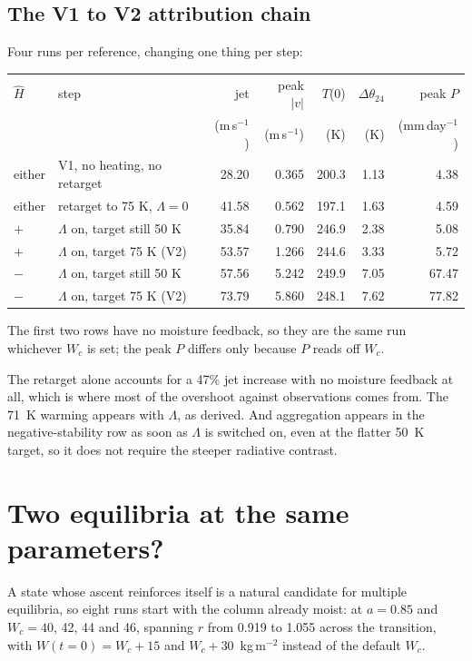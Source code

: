 \documentclass[11pt]{article}
\newcommand{\Hhat}{\hat{H}}
\newcommand{\mmday}{mm\,day$^{-1}$}
\newcommand{\ms}{m\,s$^{-1}$}
\begin{document}
\subsection{The V1 to V2 attribution chain}

Four runs per reference, changing one thing per step:

\begin{center}
\footnotesize
\begin{tabular}{llrrrrr}
\toprule
$\Hhat$ & step & jet & peak $|v|$ & $T$(0) & $\Delta\theta_{24}$ & peak $P$\\
 & & (\ms) & (\ms) & (K) & (K) & (\mmday)\\
\midrule
either & V1, no heating, no retarget      & 28.20 & 0.365 & 200.3 & 1.13 & 4.38\\
either & retarget to 75 K, $\Lambda=0$    & 41.58 & 0.562 & 197.1 & 1.63 & 4.59\\
\midrule
$+$ & $\Lambda$ on, target still 50 K & 35.84 & 0.790 & 246.9 & 2.38 & 5.08\\
$+$ & $\Lambda$ on, target 75 K (V2)  & 53.57 & 1.266 & 244.6 & 3.33 & 5.72\\
\midrule
$-$ & $\Lambda$ on, target still 50 K & 57.56 & 5.242 & 249.9 & 7.05 & 67.47\\
$-$ & $\Lambda$ on, target 75 K (V2)  & 73.79 & 5.860 & 248.1 & 7.62 & 77.82\\
\bottomrule
\end{tabular}
\end{center}

\noindent The first two rows have no moisture feedback, so they are the same run
whichever $W_c$ is set; the peak $P$ differs only because $P$ reads off $W_c$.

The retarget alone accounts for a 47\% jet increase with no moisture feedback at
all, which is where most of the overshoot against observations comes from. The
71~K warming appears with $\Lambda$, as derived. And aggregation appears in the
negative-stability row as soon as $\Lambda$ is switched on, even at the flatter
50~K target, so it does not require the steeper radiative contrast.

\section{Two equilibria at the same parameters?}
\label{sec:multistable}

A state whose ascent reinforces itself is a natural candidate for multiple
equilibria, so eight runs start with the column already moist: at
$a = 0.85$ and $W_c = 40$, 42, 44 and 46, spanning $r$ from 0.919 to 1.055
across the transition, with $W(t=0) = W_c + 15$ and $W_c + 30$~kg\,m$^{-2}$
instead of the default $W_c$.
\end{document}
